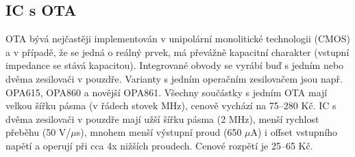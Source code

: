 \subsection{IC s OTA}
OTA bývá nejčastěji implementován v unipolární monolitické technologii (CMOS) a v případě, že se jedná o reálný prvek, má převážně kapacitní charakter (vstupní impedance se stává kapacitou). Integrované obvody se vyrábí buď s jedním nebo dvěma zesilovači v pouzdře. Varianty s jedním operačním zesilovačem jsou např. OPA615, OPA860 a novější OPA861. Všechny součástky s jedním OTA mají velkou šířku pásma (v řádech stovek MHz), cenově vychází na 75--280 Kč. IC s dvěma zesilovači v pouzdře mají užší šířku pásma (2 MHz), menší rychlost přeběhu (50 V/$\mu$s), mnohem menší výstupní proud (650 $\mu$A) i offset vstupního napětí a operují při cca 4x nižších proudech. Cenové rozpětí je 25--65 Kč.
\renewcommand{\arraystretch}{1.5}
\begin{table}[h]
  \caption[Porovnání integrovaných obvodů s jedním OTA]{\label{tab:Porovnání IC s jedním OTA}Porovnání IC s jedním OTA \cite{9}}
  \end{table}
